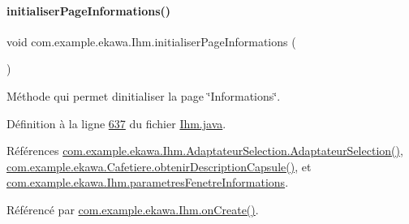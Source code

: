 \mbox{\label{classcom_1_1example_1_1ekawa_1_1_ihm_ad431346f0a437b4f23697208c5048a02}} 
\paragraph{\texorpdfstring{initialiser\+Page\+Informations()}{initialiserPageInformations()}}
{\footnotesize\ttfamily void com.\+example.\+ekawa.\+Ihm.\+initialiser\+Page\+Informations (\begin{DoxyParamCaption}{ }\end{DoxyParamCaption})\hspace{0.3cm}{\ttfamily [private]}}



Méthode qui permet d\textquotesingle{}initialiser la page \char`\"{}\+Informations\char`\"{}. 



Définition à la ligne \hyperlink{_ihm_8java_source_l00637}{637} du fichier \hyperlink{_ihm_8java_source}{Ihm.\+java}.



Références \hyperlink{_ihm_8java_source_l00156}{com.\+example.\+ekawa.\+Ihm.\+Adaptateur\+Selection.\+Adaptateur\+Selection()}, \hyperlink{_cafetiere_8java_source_l00202}{com.\+example.\+ekawa.\+Cafetiere.\+obtenir\+Description\+Capsule()}, et \hyperlink{_ihm_8java_source_l00124}{com.\+example.\+ekawa.\+Ihm.\+parametres\+Fenetre\+Informations}.



Référencé par \hyperlink{_ihm_8java_source_l00248}{com.\+example.\+ekawa.\+Ihm.\+on\+Create()}.


